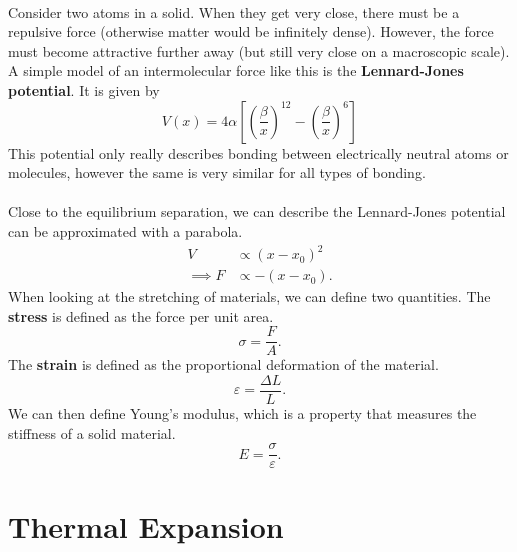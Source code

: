 \documentclass[../thermodynamics.tex]{subfiles}
\begin{document}
        \paragraph{}
        Consider two atoms in a solid. When they get very close, there must be a repulsive force (otherwise matter would be infinitely dense).
        However, the force must become attractive further away (but still very close on a macroscopic scale).
        A simple model of an intermolecular force like this is the \textbf{Lennard-Jones potential}.
        It is given by
        \begin{equation}
            V(x)=4\alpha\left[\left(\frac{\beta}{x}\right)^{12}-\left(\frac{\beta}{x}\right)^6\right]
        \end{equation}
        This potential only really describes bonding between electrically neutral atoms or molecules, however the same is very similar for all types of bonding.

        \paragraph{}
        Close to the equilibrium separation, we can describe the Lennard-Jones potential can be approximated with a parabola.
        \begin{align}
            V&\propto(x-x_0)^2\\
            \implies F&\propto-(x-x_0).
        \end{align}
        When looking at the stretching of materials, we can define two quantities.
        The \textbf{stress} is defined as the force per unit area.
        \begin{equation}
            \sigma=\frac{F}{A}.
        \end{equation}
        The \textbf{strain} is defined as the proportional deformation of the material.
        \begin{equation}
            \varepsilon=\frac{\Delta L}{L}.
        \end{equation}
        We can then define Young's modulus, which is a property that measures the stiffness of a solid material.
        \begin{equation}
            E=\frac{\sigma}{\varepsilon}.
        \end{equation}

    \section{Thermal Expansion}
\end{document}
